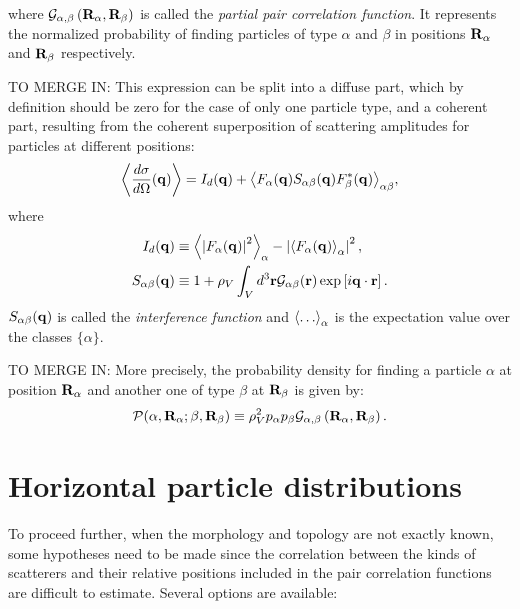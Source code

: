 where $\mathcal{G}_{\alpha ,\beta}\left( \mathbf{R}_{\alpha} , \mathbf{R}_{\beta} \right)$ is called the \emph{partial pair correlation function}. It represents the normalized probability of finding particles of type $\alpha$ and $\beta$ in positions $\mathbf{R}_\alpha$ and $\mathbf{R}_\beta$ respectively. 

TO MERGE IN:
This expression can be split into a diffuse part, which by definition should be zero for the case of only one particle type, and a coherent part, resulting from the coherent superposition of scattering amplitudes for particles at different positions:
\begin{equation*}
  \left\langle \frac{d\sigma}{d\Omega}(\mathbf{q}) \right\rangle
  = I_d(\mathbf{q}) + {\left\langle F_\alpha (\mathbf{q} ) S_{\alpha\beta} (\mathbf{q}) F_\beta^* (\mathbf{q})
               \right\rangle}_{\alpha\beta},
\end{equation*}
where
\begin{align*}
  I_d(\mathbf{q}) &
  \equiv {\ensuremath{\left\langle}\left\rvert F_\alpha (\ensuremath{\mathbf{q}}) \right\rvert^2\ensuremath{\right\rangle}}_{\alpha}
       - \left\lvert {\ensuremath{\left\langle}F_\alpha (\ensuremath{\mathbf{q}})\ensuremath{\right\rangle}}_{\alpha} \right\rvert^2, \\
  S_{\alpha\beta} (\mathbf{q}) &\equiv 1 + \rho_V \int_V d^3\mathbf{r}\mathcal{G}_{\alpha\beta}(\mathbf{r}) \exp \left[ i\mathbf{q}\cdot \mathbf{r} \right].
\end{align*}
$S_{\alpha\beta} (\mathbf{q})$ is called the \emph{interference function} and $\bra\dotso\ket_\alpha$ is the expectation value over the classes $\lbrace \alpha\rbrace$.


TO MERGE IN:
More precisely, the probability density for finding a particle $\alpha$ at position $\mathbf{R}_\alpha$ and another one of type $\beta$ at $\mathbf{R}_\beta$ is given by:
\begin{equation*}
  \mathcal{P}(\alpha, \mathbf{R}_\alpha ; \beta , \mathbf{R}_\beta ) \equiv \rho_V^2 p_\alpha p_\beta \mathcal{G}_{\alpha ,\beta}\left( \mathbf{R}_{\alpha} , \mathbf{R}_{\beta} \right).
\end{equation*}


\section{Horizontal particle distributions}

To proceed further, when the morphology and topology are not exactly known, some hypotheses need to be made since the correlation between the kinds of scatterers and their relative positions included in the pair correlation functions are difficult to estimate. Several options are available:

